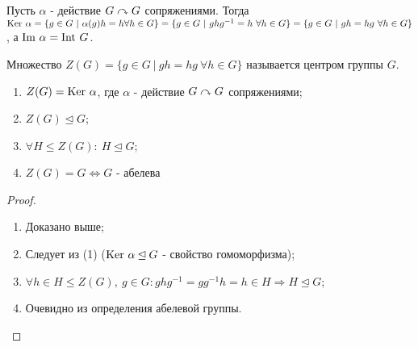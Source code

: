 Пусть $\alpha$ - действие $G\curvearrowright G$ сопряжениями. Тогда 
$\textup{Ker } \alpha = \{g \in G \ | \ \alpha(g)h = h \\ \forall h \in G\} = \{g \in G \ | \ ghg^{-1} = h \ \forall h \in G\} = \{g \in G \ | \ gh = hg \ \forall h \in G\}$, а $\textup{Im } \alpha = \textup{Int }G$.
\begin{definition}
    Множество $Z(G) = \{g \in G \ | \ gh = hg \ \forall h \in G\}$ называется центром группы $G$.
\end{definition}
\begin{properties}\tab
    \begin{enumerate}
        \item $Z(G) = \textup{Ker } \alpha$, где $\alpha$ - действие $G \curvearrowright G$ сопряжениями;
        \item $Z(G) \unlhd G$;
        \item $\forall H \leq Z(G): \ H \unlhd G$;
        \item $Z(G) = G \Longleftrightarrow G$ - абелева
    \end{enumerate}    
\end{properties}
\begin{proof}\tab
    \begin{enumerate}
        \item Доказано выше;
        \item Следует из (1) ($\textup{Ker }\alpha \unlhd G$ - свойство гомоморфизма);
        \item $\forall h \in H \leq Z(G),\ g \in G: ghg^{-1} = gg^{-1}h = h \in H \Longrightarrow H \unlhd G$;
        \item Очевидно из определения абелевой группы.
    \end{enumerate}
\end{proof}




\setcounter{thcount}{0}
\setcounter{concount}{0}
\setcounter{subthcount}{0}
\setcounter{lemcount}{0}
